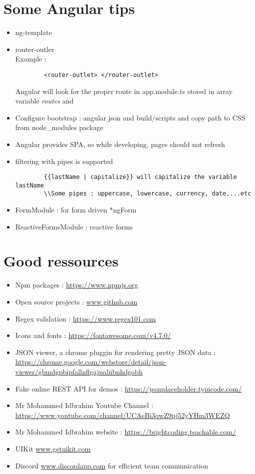 \documentclass{article}
\begin{document}
\section{Some Angular tips}
\begin{itemize}
    \item ng-template
    \item router-outler
    \\Example : \begin{verbatim}
        <router-outlet> </router-outlet>
    \end{verbatim}
    Angular will look for the proper route in app.module.ts stored in array variable \textit{routes} and 
    
    \item Configure bootstrap : angular.json and build/scripts and copy path to CSS from node\_modules package
    \item Angular provides SPA, so while developing, pages should not refresh 
    \item filtering with pipes is supported 
    \begin{verbatim}
        {{lastName | capitalize}} will capitalize the variable lastName
        \\Some pipes : uppercase, lowercase, currency, date,...etc 
    \end{verbatim}
    \item FormModule : for form driven *ngForm
    \item ReactiveFormsModule : reactive forms 
\end{itemize}
\section{Good ressources}
\begin{itemize}
    \item Npm packages : \url{https://www.npmjs.org}
    \item Open source projects : \url{www.github.com}
    \item Regex validation : \url{https://www.regex101.com}
    \item Icons and fonts : \url{https://fontawesome.com/v4.7.0/}
    \item JSON viewer, a chrome pluggin for rendering pretty JSON data : \url{https://chrome.google.com/webstore/detail/json-viewer/gbmdgpbipfallnflgajpaliibnhdgobh}
    \item Fake online REST API for demos :  \url{https://jsonplaceholder.typicode.com/}
    \item Mr Mohammed Idbrahim Youtube Channel  : \url{https://www.youtube.com/channel/UCAeBi3qwZ9pj52yYHm3WEZQ}
    \item Mr Mohammed Idbrahim website : \url{https://brightcoding.teachable.com/}
    \item UIKit \url{www.getuikit.com} 
    \item Discord \url{www.discordapp.com} for efficient team communication
\end{itemize}
\end{document}
